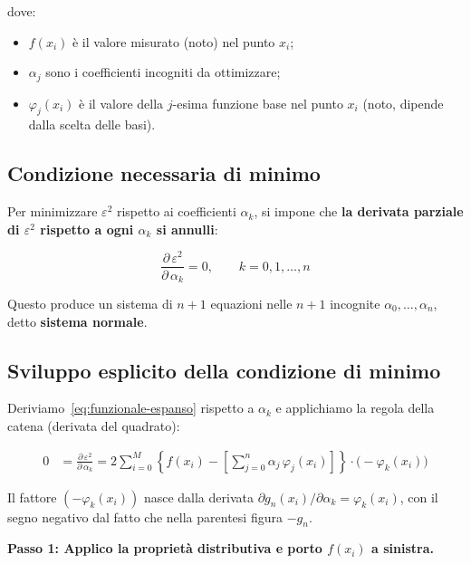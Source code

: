 \documentclass[a4paper,12pt]{article}
\theoremstyle{definition}
\theoremstyle{remark}
\begin{document}
\noindent dove:
\begin{itemize}
  \item $f(x_i)$ è il valore misurato (noto) nel punto $x_i$;
  \item $\alpha_j$ sono i coefficienti incogniti da ottimizzare;
  \item $\varphi_j(x_i)$ è il valore della $j$-esima funzione base
        nel punto $x_i$ (noto, dipende dalla scelta delle basi).
\end{itemize}

\subsection{Condizione necessaria di minimo}

Per minimizzare $\varepsilon^2$ rispetto ai coefficienti $\alpha_k$,
si impone che \textbf{la derivata parziale di $\varepsilon^2$ rispetto
a ogni $\alpha_k$ si annulli}:

\begin{equation}
  \frac{\partial\,\varepsilon^2}{\partial\,\alpha_k} = 0,
  \qquad k = 0, 1, \ldots, n
  \label{eq:condizione-minimo}
\end{equation}

\noindent Questo produce un sistema di $n+1$ equazioni nelle $n+1$
incognite $\alpha_0, \ldots, \alpha_n$, detto \textbf{sistema normale}.

\subsection{Sviluppo esplicito della condizione di minimo}

Deriviamo~\eqref{eq:funzionale-espanso} rispetto a $\alpha_k$ e
applichiamo la regola della catena (derivata del quadrato):

\begin{align}
  0
  &= \frac{\partial\,\varepsilon^2}{\partial\,\alpha_k}
   = 2\sum_{i=0}^{M}
     \left\{f(x_i) - \left[\sum_{j=0}^{n} \alpha_j\,\varphi_j(x_i)\right]
     \right\}
     \cdot \bigl(-\varphi_k(x_i)\bigr)
  \label{eq:deriv1}
\end{align}

\noindent Il fattore $(-\varphi_k(x_i))$ nasce dalla derivata
$\partial g_n(x_i)/\partial\alpha_k = \varphi_k(x_i)$, con il segno
negativo dal fatto che nella parentesi figura $-g_n$.

\medskip
\noindent \textbf{Passo 1: Applico la proprietà distributiva e porto
$f(x_i)$ a sinistra.}
\end{document}
